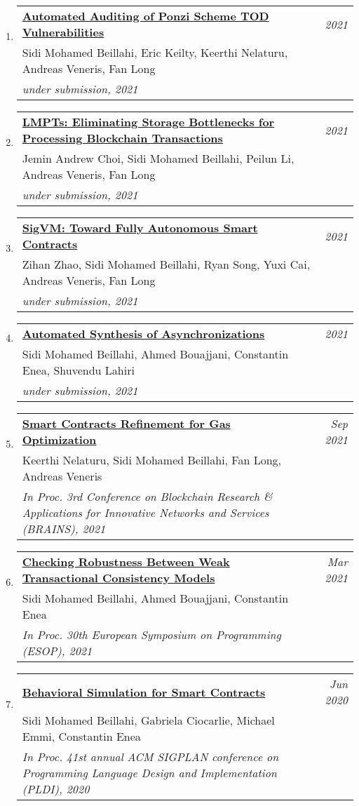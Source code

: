 \documentclass[10pt]{article}
\makeatletter
\newcommand{\lbar}[1]{{\color{#1}\ding{118}}\hspace*{2pt}}
\newenvironment{benumerate}[2]{
    \let\oldItem\item
    \def\item{\addtocounter{enumi}{-2}\oldItem}
    \begin{enumerate}[#2] \itemsep3pt
    \setcounter{enumi}{#1}
    \addtocounter{enumi}{1}}
  {\end{enumerate}}
\newenvironment{publication}[5]
{ \item
  \begin{tabular*}{7.5in}{p{6.3in}@{\extracolsep{\fill}}r}
    \href{#1}{\textbf{#2}} & \textit{#3}\\ #4 &\\ \textit{#5}&\\
  \end{tabular*}
} {}
\newenvironment{region}[3]{%
  \vspace*{0.5ex}
  {\scalebox{1.4}{\textbf{#1}}}
  \begin{benumerate}{#3}{\color{RoyalBlue}#2}}
  {\end{benumerate}\vspace{0.8ex}}
\makeatother
\begin{document}
\begin{region} {\lbar{purple}Conference Publications}{{C}1}{11}

  \begin{publication} {https://beillahi.github.io/papers/TOD.pdf}
		{Automated Auditing of Ponzi Scheme TOD Vulnerabilities}
		{2021} {Sidi Mohamed Beillahi, Eric Keilty, Keerthi Nelaturu, Andreas Veneris, Fan Long}
		{under submission, 2021}
  \end{publication}

  \begin{publication} {https://beillahi.github.io/papers/LMPT.pdf}
		{LMPTs: Eliminating Storage Bottlenecks for Processing Blockchain Transactions}
		{2021} {Jemin Andrew Choi, Sidi Mohamed Beillahi, Peilun Li, Andreas Veneris, Fan Long}
		{under submission, 2021}
  \end{publication}
  
  \begin{publication} {https://arxiv.org/pdf/2102.10784.pdf}
		{SigVM: Toward Fully Autonomous Smart Contracts}
		{2021} {Zihan Zhao, Sidi Mohamed Beillahi, Ryan Song, Yuxi Cai, Andreas Veneris, Fan Long}
		{under submission, 2021}
  \end{publication}

  \begin{publication} {https://beillahi.github.io/papers/asynchrony.pdf}
		{Automated Synthesis of Asynchronizations}
		{2021} {Sidi Mohamed Beillahi, Ahmed Bouajjani, Constantin Enea, Shuvendu Lahiri}
		{under submission, 2021}
  \end{publication}

  \begin{publication} {https://beillahi.github.io/papers/BRAINS21.pdf}
		{Smart Contracts Refinement for Gas Optimization}
		{Sep 2021} {Keerthi Nelaturu, Sidi Mohamed Beillahi, Fan Long, Andreas Veneris}
		{In Proc. 3rd Conference on Blockchain Research \& Applications for Innovative Networks and Services (BRAINS), 2021}
  \end{publication}

  \begin{publication} {https://beillahi.github.io/papers/ESOP21.pdf}
		{Checking Robustness Between Weak Transactional Consistency Models}
		{Mar 2021} {Sidi Mohamed Beillahi, Ahmed Bouajjani, Constantin Enea} 
		{In Proc. 30th European Symposium on Programming (ESOP), 2021} 
  \end{publication}

	\begin{publication} {https://beillahi.github.io/papers/PLDI20.pdf}
		{Behavioral Simulation for Smart Contracts}
		{Jun 2020} {Sidi Mohamed Beillahi, Gabriela Ciocarlie, Michael Emmi, Constantin Enea}
		{In Proc. 41st annual ACM SIGPLAN conference on Programming Language Design and Implementation (PLDI), 2020}
  \end{publication}


\end{region}
\end{document}
